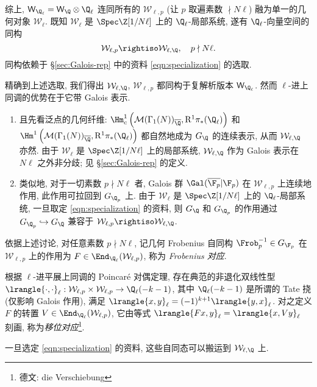 综上, $\mathsf{W}_{\Q_\ell} = \mathsf{W}_{\Q} \otimes \Q_\ell$ 连同所有的 $\mathcal{W}_{\ell, p}$ (让 $p$ 取遍素数 $\nmid N\ell$) 融为单一的几何对象 $\mathcal{W}_\ell$. 既知 $\mathcal{W}_\ell$ 是 $\Spec \Z[1/N\ell]$ 上的 $\Q_\ell$-局部系统, 遂有 $\Q_\ell$-向量空间的同构
\begin{equation}\label{eqn:W-isom}
	\mathcal{W}_{\ell, p} \rightiso \mathcal{W}_{\ell, \Q}, \quad p \nmid N\ell.
\end{equation}
同构依赖于 \S\ref{sec:Galois-rep} 中的资料 \eqref{eqn:specialization} 的选取.

精确到上述选取, 我们得出 $\mathcal{W}_{\ell, \Q}$, $\mathcal{W}_{\ell, p}$ 都同构于复解析版本 $\mathsf{W}_{\Q_\ell}$. 然而 $\ell$-进上同调的优势在于它带 Galois 表示.
\begin{enumerate}
	\item 且先看泛点的几何纤维: $\Hm^1_c\left(\mathcal{M}(\Gamma_1(N))_{\overline{\Q}}, \mathrm{R}^1 \pi_* (\Q_\ell)\right)$ 和 $\Hm^1\left(\mathcal{M}(\Gamma_1(N))_{\overline{\Q}}, \mathrm{R}^1 \pi_* (\Q_\ell)\right)$ 都自然地成为 $G_{\Q}$ 的连续表示, 从而 $\mathcal{W}_{\ell, \Q}$ 亦然. 由于 $\mathcal{W}_\ell$ 是 $\Spec \Z[1/N\ell]$ 上的局部系统, $\mathcal{W}_{\ell, \Q}$ 作为 Galois 表示在 $N\ell$ 之外非分歧; 见 \S\ref{sec:Galois-rep} 的定义.
	\item 类似地, 对于一切素数 $p \nmid N\ell$ 者, Galois 群 $\Gal(\overline{\F_p}|\F_p)$ 在 $\mathcal{W}_{\ell, p}$ 上连续地作用, 此作用可拉回到 $G_{\Q_p}$ 上. 由于 $\mathcal{W}_\ell$ 是 $\Spec\Z[1/N\ell]$ 上的 $\Q_\ell$-局部系统, 一旦取定 \eqref{eqn:specialization} 的资料, 则 $G_{\Q}$ 和 $G_{\Q_p}$ 的作用通过 $G_{\Q_p} \hookrightarrow G_{\Q}$ 兼容于 $\mathcal{W}_{\ell, p} \rightiso \mathcal{W}_{\ell, \Q}$.
\end{enumerate}

\begin{definition}\label{def:FV}
	依据上述讨论, 对任意素数 $p \nmid N\ell$, 记几何 Frobenius 自同构 $\Frob_p^{-1} \in G_{\F_p}$ 在 $\mathcal{W}_{\ell, p}$ 上的作用为 $F \in \End_{\Q_\ell}(\mathcal{W}_{\ell, p})$, 称为 \emph{Frobenius 对应}.
	
	根据 $\ell$-进平展上同调的 Poincaré 对偶定理, 存在典范的非退化双线性型 $\lrangle{\cdot, \cdot}_\ell: \mathcal{W}_{\ell, p} \times \mathcal{W}_{\ell, p} \to \Q_\ell(-k-1)$, 其中 $\Q_\ell(-k-1)$ 是所谓的 Tate 挠 (仅影响 Galois 作用), 满足 $\lrangle{x, y}_\ell = (-1)^{k+1} \lrangle{y, x}_\ell$. 对之定义 $F$ 的转置 $V \in \End_{\Q_\ell}(\mathcal{W}_{\ell, p})$, 它由等式 $\lrangle{Fx, y}_\ell = \lrangle{x, Vy}_\ell$ 刻画, 称为\emph{移位对应}\footnote{德文: die Verschiebung}.
	
	一旦选定 \eqref{eqn:specialization} 的资料, 这些自同态可以搬运到 $\mathcal{W}_{\ell, \Q}$ 上.
\end{definition}

